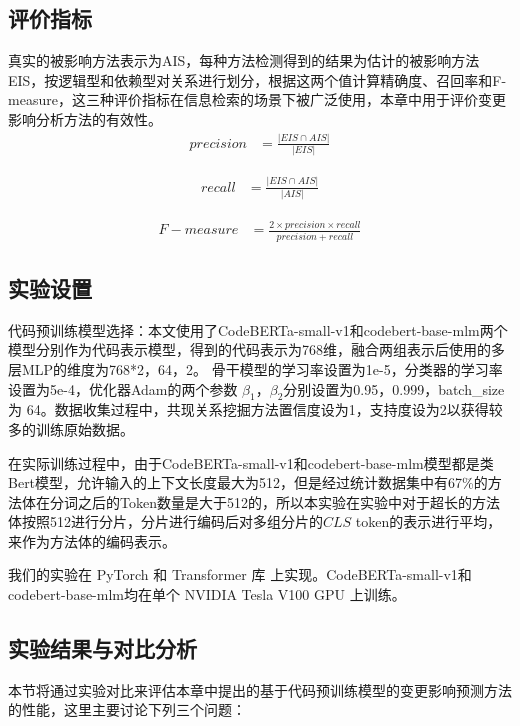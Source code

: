 \subsection{评价指标}\label{1_评价指标}

真实的被影响方法表示为AIS，每种方法检测得到的结果为估计的被影响方法EIS，按逻辑型和依赖型对关系进行划分，根据这两个值计算精确度、召回率和F-measure，这三种评价指标在信息检索的场景下被广泛使用，本章中用于评价变更影响分析方法的有效性。
\begin{align}
precision &= \frac{|EIS \cap AIS|}{|EIS|} 
\end{align}

\begin{align}
recall &= \frac{|EIS \cap AIS|}{|AIS|}  
\end{align}

\begin{align}
F-measure &= \frac{2 \times precision \times recall}{precision + recall} 
\end{align}


\subsection{实验设置}

代码预训练模型选择：本文使用了CodeBERTa-small-v1和codebert-base-mlm两个模型分别作为代码表示模型，得到的代码表示为768维，融合两组表示后使用的多层MLP的维度为768*2，64，2。 骨干模型的学习率设置为1e-5，分类器的学习率设置为5e-4，优化器Adam的两个参数 $\beta_1$，$\beta_2$分别设置为0.95，0.999，batch\_size 为 64。数据收集过程中，共现关系挖掘方法置信度设为1，支持度设为2以获得较多的训练原始数据。

在实际训练过程中，由于CodeBERTa-small-v1和codebert-base-mlm模型都是类Bert模型，允许输入的上下文长度最大为512，但是经过统计数据集中有67\%的方法体在分词之后的Token数量是大于512的，所以本实验在实验中对于超长的方法体按照512进行分片，分片进行编码后对多组分片的$CLS$ token的表示进行平均，来作为方法体的编码表示。

我们的实验在 PyTorch 和 Transformer 库 上实现。CodeBERTa-small-v1和codebert-base-mlm均在单个 NVIDIA Tesla V100 GPU 上训练。


\subsection{实验结果与对比分析}

本节将通过实验对比来评估本章中提出的基于代码预训练模型的变更影响预测方法的性能，这里主要讨论下列三个问题：

